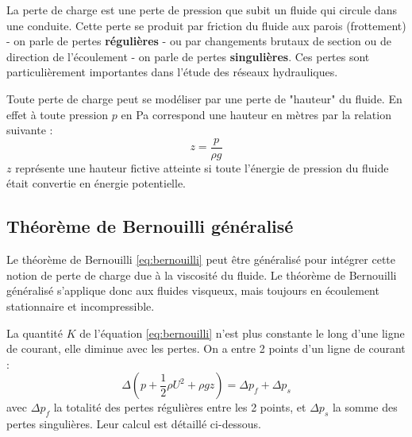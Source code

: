 La perte de charge est une perte de pression que subit un fluide qui circule dans une conduite. Cette perte se produit par friction du fluide aux parois (frottement) - on parle de pertes \textbf{régulières} - ou par changements brutaux de section ou de direction de l'écoulement - on parle de pertes \textbf{singulières}. Ces pertes sont particulièrement importantes dans l'étude des réseaux hydrauliques.

Toute perte de charge peut se modéliser par une perte de "hauteur" du fluide. En effet à toute pression $p$ en \si{\pascal} correspond une hauteur en mètres par la relation suivante :
%
\begin{equation}
    z = \frac{p}{\rho g}
\end{equation}
%
$z$ représente une hauteur fictive atteinte si toute l'énergie de pression du fluide était convertie en énergie potentielle.


\subsection{Théorème de Bernouilli généralisé}

Le théorème de Bernouilli \eqref{eq:bernouilli} peut être généralisé pour intégrer cette notion de perte de charge due à la viscosité du fluide. Le théorème de Bernouilli généralisé s'applique donc aux fluides visqueux, mais toujours en écoulement stationnaire et incompressible.

La quantité $K$ de l'équation \eqref{eq:bernouilli} n'est plus constante le long d'une ligne de courant, elle diminue avec les pertes. On a entre 2 points d'un ligne de courant :
%
\begin{equation}
    \Delta \left( p + \frac{1}{2}\rho U^2 + \rho g z \right) = \Delta p_f + \Delta p_s
\end{equation}
%
avec $\Delta p_f$ la totalité des pertes régulières entre les 2 points, et $\Delta p_s$ la somme des pertes singulières. Leur calcul est détaillé ci-dessous.


